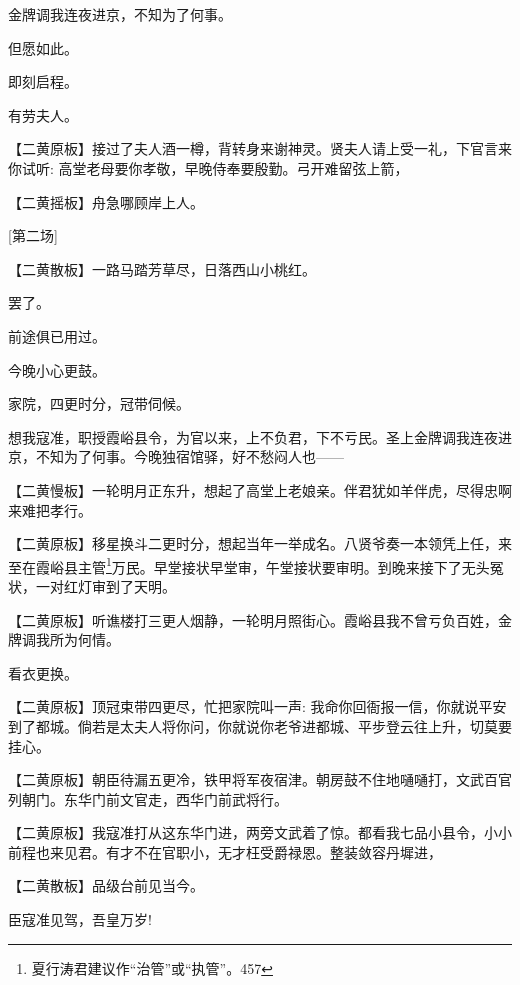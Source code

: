 {{金牌调我连夜进京，不知为了何事。}

{但愿如此。}

{即刻启程。}

{有劳夫人。}

\setlength{\hangindent}{60pt} {【{\akai 二黄原板}】接过了夫人酒一樽，背转身来谢神灵。贤夫人请上受一礼，下官言来你试听: 高堂老母要你孝敬，早晚侍奉要殷勤。弓开难留弦上箭，}

\setlength{\hangindent}{60pt} {【{\akai 二黄摇板}】舟急哪顾岸上人。}

{[}第二场{]}

\setlength{\hangindent}{60pt} {【{\akai 二黄散板}】一路马踏芳草尽，日落西山小桃红。}

{罢了。}

{前途俱已用过。}

{今晚小心更鼓。}

{家院，四更时分，冠带伺候。}

{想我寇准，职授霞峪县令，为官以来，上不负君，下不亏民。圣上金牌调我连夜进京，不知为了何事。今晚独宿馆驿，好不愁闷人也------}

\setlength{\hangindent}{60pt} {【{\akai 二黄慢板}】一轮明月正东升，想起了高堂上老娘亲。伴君犹如羊伴虎，尽得忠啊来难把孝行。}

\setlength{\hangindent}{60pt} {【{\akai 二黄原板}】移星换斗二更时分，想起当年一举成名。八贤爷奏一本领凭上任，来至在霞峪县主管}\footnote{ 夏行涛君建议作``治管''或``执管''。{457}}{万民。早堂接状早堂审，午堂接状要审明。到晚来接下了无头冤状，一对红灯审到了天明。}

\setlength{\hangindent}{60pt} {【{\akai 二黄原板}】听谯楼打三更人烟静，一轮明月照街心。霞峪县我不曾亏负百姓，金牌调我所为何情。}

{看衣更换。}

\setlength{\hangindent}{60pt} {【{\akai 二黄原板}】顶冠束带四更尽，忙把家院叫一声: 我命你回衙报一信，你就说平安到了都城。倘若是太夫人将你问，你就说你老爷进都城、平步登云往上升，切莫要挂心。}

\setlength{\hangindent}{60pt} {【{\akai 二黄原板}】朝臣待漏五更冷，铁甲将军夜宿津。朝房鼓不住地嗵嗵打，文武百官列朝门。东华门前文官走，西华门前武将行。}

\setlength{\hangindent}{60pt} {【{\akai 二黄原板}】我寇准打从这东华门进，两旁文武着了惊。都看我七品小县令，小小前程也来见君。有才不在官职小，无才枉受爵禄恩。整装敛容丹墀进，}

\setlength{\hangindent}{60pt} {【{\akai 二黄散板}】品级台前见当今。}

{臣寇准见驾，吾皇万岁!}

}
